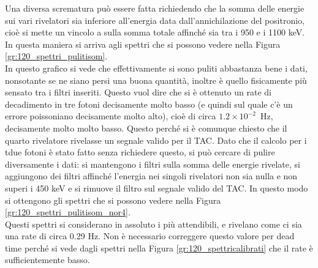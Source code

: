 Una diversa scrematura può essere fatta richiedendo che la somma delle energie sui vari rivelatori sia inferiore all'energia data dall'annichilazione del positronio, cioè si
mette un vincolo a sulla somma totale affinché sia tra i 950 e i 1100 keV. In questa maniera si arriva agli spettri che si possono vedere nella 
Figura \ref{gr:120_spettri_pulitisom}.\\


In questo grafico si vede che effettivamente si sono puliti abbastanza bene i dati, nonsotante se ne siano persi una buona quantità, inoltre è quello fisicamente più
sensato tra i filtri inseriti. Questo vuol dire che si è ottenuto un rate di decadimento in tre fotoni decisamente molto basso (e quindi sul quale c'è un errore poissoniano
decisamente molto alto), cioè di circa $1.2 \times 10^{-2}$~Hz, decisamente molto molto basso. Questo perché si è comunque chiesto che il quarto rivelatore rivelasse un
segnale valido per il TAC. Dato che il calcolo per i tdue fotoni è stato fatto senza richiedere questo, si può cercare di pulire diversamente i dati: si mantengono i filtri
sulla somma delle energie rivelate, si aggiungono dei filtri affinché l'energia nei singoli rivelatori non sia nulla e non superi i 450 keV e si rimuove il filtro sul
segnale valido del TAC. In questo modo si ottengono gli spettri che si possono vedere nella Figura \ref{gr:120_spettri_pulitisom_nor4}.\\


Questi spettri si considerano in assoluto i più attendibili, e rivelano come ci sia una rate di circa 0.29 Hz. Non è necessario correggere questo valore per dead time perché
si vede dagli spettri nella Figura \ref{gr:120_spettricalibrati} che il rate è sufficientemente basso.

